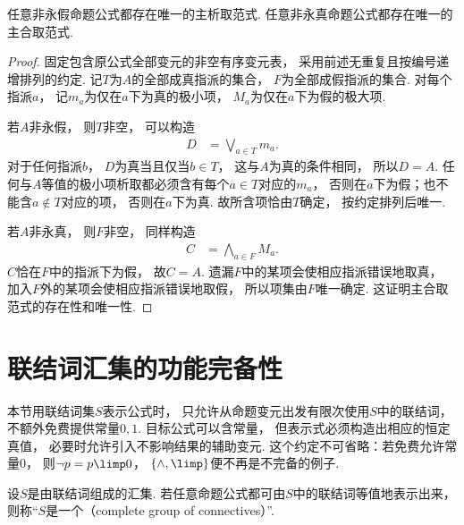 \begin{theorem}
任意非永假命题公式都存在唯一的主析取范式.
任意非永真命题公式都存在唯一的主合取范式.
    \begin{proof}
        固定包含原公式全部变元的非空有序变元表，
        采用前述无重复且按编号递增排列的约定.
        记\(T\)为\(A\)的全部成真指派的集合，
        \(F\)为全部成假指派的集合.
        对每个指派\(a\)，
        记\(m_a\)为仅在\(a\)下为真的极小项，
        \(M_a\)为仅在\(a\)下为假的极大项.

        若\(A\)非永假，
        则\(T\)非空，
        可以构造
        \begin{align*}
            D &= \bigvee_{a\in T}m_a.
        \end{align*}
        对于任何指派\(b\)，
        \(D\)为真当且仅当\(b\in T\)，
        这与\(A\)为真的条件相同，
        所以\(D=A\).
        任何与\(A\)等值的极小项析取都必须含有每个\(a\in T\)对应的\(m_a\)，
        否则在\(a\)下为假；也不能含\(a\notin T\)对应的项，
        否则在\(a\)下为真.
        故所含项恰由\(T\)确定，
        按约定排列后唯一.

        若\(A\)非永真，
        则\(F\)非空，
        同样构造
        \begin{align*}
            C &= \bigwedge_{a\in F}M_a.
        \end{align*}
        \(C\)恰在\(F\)中的指派下为假，
        故\(C=A\).
        遗漏\(F\)中的某项会使相应指派错误地取真，
        加入\(F\)外的某项会使相应指派错误地取假，
        所以项集由\(F\)唯一确定.
        这证明主合取范式的存在性和唯一性.
    \end{proof}
\end{theorem}

\section{联结词汇集的功能完备性}
本节用联结词集\(S\)表示公式时，
只允许从命题变元出发有限次使用\(S\)中的联结词，
不额外免费提供常量\(0,1\).
目标公式可以含常量，
但表示式必须构造出相应的恒定真值，
必要时允许引入不影响结果的辅助变元.
这个约定不可省略：若免费允许常量\(0\)，
则\(\neg p=p\limp0\)，
\(\{\land,\limp\}\)便不再是不完备的例子.
\begin{definition}
设\(S\)是由联结词组成的汇集.
若任意命题公式都可由\(S\)中的联结词等值地表示出来，
则称“\(S\)是一个（complete group of connectives）”.
\end{definition}

